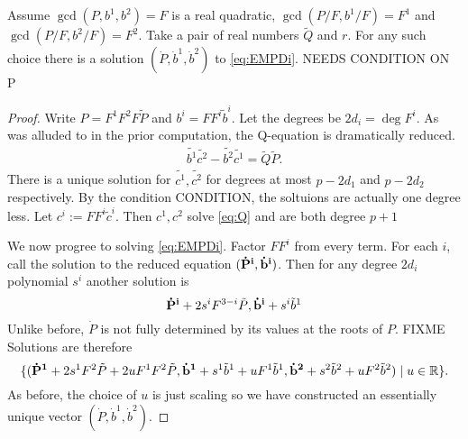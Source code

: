 \begin{lem}
Assume $\gcd(P,b^1,b^2) = F$ is a real quadratic, $\gcd(P/F,b^1/F)=F^1$ and $\gcd(P/F,b^2/F)=F^2$. Take a pair of real numbers $\tilde Q$ and $r$. For any such choice there is a solution $(\dot P, \dot b^1, \dot b^2)$ to \eqref{eq:EMPDi}. NEEDS CONDITION ON P 
\begin{proof}

Write $P = F^1F^2F\tilde{P}$ and $b^i = FF^i\tilde b^i$. Let the degrees be $2d_i = \deg F^i$. As was alluded to in the prior computation, the Q-equation is dramatically reduced.
\begin{align}
\tilde{b^1}\tilde{c^2} - \tilde{b^2}\tilde{c^1} = \tilde{Q}\tilde{P}.
\end{align}
There is a unique solution for $\tilde{c^1},\tilde{c^2}$ for degrees at most $p-2d_1$ and $p-2d_2$ respectively. By the condition CONDITION, the soltuions are actually one degree less. Let $c^i :=  FF^i\tilde{c}^i$. Then $c^1, c^2$ solve \eqref{eq:Q} and are both degree $p+1$

We now progree to solving \eqref{eq:EMPDi}. Factor $FF^i$ from every term. For each $i$, call the solution to the reduced equation $({\bf\dot P^i}, {\bf\dot b^i})$. Then for any degree $2d_i$ polynomial $s^i$ another solution is
\[
{\bf\dot P^i} + 2s^i F^{3-i}\tilde P, {\bf\dot b^i} + s^i \tilde b^1
\]
Unlike before, $\dot P$ is not fully determined by its values at the roots of $P$. FIXME  Solutions are therefore
\[
\{ ({\bf \dot P^1} + 2s^1 F^2 \tilde{P} + 2u F^1F^2\tilde{P}, {\bf \dot b^1} + s^1\tilde{b}^1 + u F^1\tilde{b}^1, {\bf \dot b^2} + s^2\tilde{b}^2 + uF^2 \tilde{b}^2) \mid u \in \mathbb{R}\}.
\]
As before, the choice of $u$ is just scaling so we have constructed an essentially unique vector $(\dot P, \dot b^1, \dot b^2)$.
\end{proof}
\end{lem}












